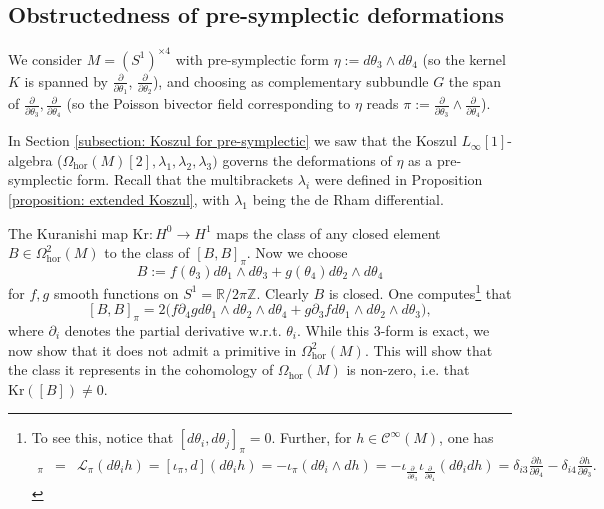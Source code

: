 \documentclass[11pt,thmsa]{amsart}
\theoremstyle{definition}
\newcommand{\hor}{\mathrm{hor}}
\newcommand{\Lie}{\mathcal{L}}
\newcommand{\ZZ}{\ensuremath{\mathbb Z}}
\newcommand{\RR}{\ensuremath{\mathbb R}}
\begin{document}
 



\subsection{Obstructedness of pre-symplectic deformations}
\label{subsec:obspre}

We consider  
  $M=(S^1)^{\times 4}$ with  pre-symplectic form $\eta:=d\theta_3 \wedge d\theta_4$ (so the kernel $K$ is spanned by $\frac{\partial}{\partial \theta_1}$, $\frac{\partial}{\partial \theta_2}$), and choosing
as complementary subbundle $G$ the span of
$\frac{\partial}{\partial \theta_3},\frac{\partial}{\partial \theta_4}$ 
(so the Poisson bivector field corresponding to $\eta$ reads
$\pi:=\frac{\partial}{\partial \theta_3}\wedge \frac{\partial}{\partial \theta_4}$).



In Section \ref{subsection: Koszul for pre-symplectic} we saw that the Koszul $L_{\infty}[1]$-algebra ($\Omega_\hor(M)[2],\lambda_1,\lambda_2,\lambda_3)$ governs the deformations of $\eta$ as a pre-symplectic form. Recall that the multibrackets $\lambda_i$ were defined in Proposition \ref{proposition: extended Koszul}, with $\lambda_1$ being the de Rham differential.
 
The Kuranishi map  
$\mathrm{Kr}\colon H^0\to H^1$ maps the class of any closed element $B\in \Omega^2_\hor(M)$ to the class of $[B,B]_{\pi}$. 
Now we choose $$B:=f(\theta_3)d\theta_1\wedge d\theta_3+g(\theta_4) d\theta_2\wedge d\theta_4$$ for $f,g$ smooth functions on $S^1=\RR/2\pi \ZZ$. Clearly $B$ is closed. One computes\footnote{To see this, notice that $[d\theta_i,d\theta_j]_{\pi}=0$. Further,  for $h\in \mathcal{C}^\infty(M)$, one has
{
\begin{eqnarray*}
[d\theta_i,h]_\pi&=&\Lie_\pi(d\theta_i h)=  [\iota_\pi,d](d\theta_i h)
= -\iota_\pi(d\theta_i \wedge dh) = -\iota_{\frac{\partial}{\partial \theta_3}}\iota_{\frac{\partial}{\partial \theta_4}}(d\theta_i dh)
= \delta_{i3} \frac{\partial h}{\partial \theta_4} - \delta_{i4} \frac{\partial h}{\partial \theta_3}.
\end{eqnarray*} } 
}
 that $$ [B,B]_{\pi}=2\big(f{\partial_4 g}d\theta_1\wedge d\theta_2\wedge d\theta_4+
g{\partial_3 f}d\theta_1\wedge d\theta_2\wedge d\theta_3),$$
where $\partial_i$ denotes the partial derivative w.r.t. $\theta_i$.
While this 3-form is exact, we now show that it does not admit a primitive in $\Omega^2_\hor(M)$. This will show that the class it represents in the cohomology of 
$\Omega_\hor(M)$ is non-zero, i.e. that $\mathrm{Kr}([B])\neq 0$.
\end{document}
